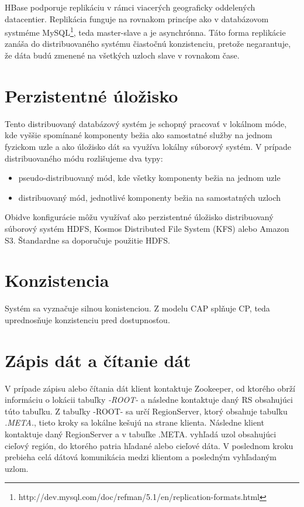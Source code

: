 \documentclass[11pt,twoside,a4paper]{book}
\begin{document}
HBase podporuje replikáciu v rámci viacerých geograficky oddelených datacentier. Replikácia funguje na rovnakom princípe ako v databázovom systméme MySQL\footnote{http://dev.mysql.com/doc/refman/5.1/en/replication-formats.html}, teda master-slave a je asynchrónna. Táto forma replikácie zanáša do distribuovaného systému čiastočnú konzistenciu, pretože negarantuje, že dáta budú zmenené na všetkých uzloch slave v rovnakom čase.




\section{Perzistentné úložisko}

Tento distribuovaný databázový systém je schopný pracovať v lokálnom móde, kde vyššie spomínané komponenty bežia ako samostatné služby na jednom fyzickom uzle a ako úložisko dát sa využíva lokálny súborový systém. V prípade distribuovaného módu rozlišujeme dva typy:
\begin{itemize}
 \item pseudo-distribuovaný mód, kde všetky komponenty bežia na jednom uzle
 \item distribuovaný mód, jednotlivé komponenty bežia na samostatných uzloch
\end{itemize}

Obidve konfigurácie môžu využívať ako perzistentné úložisko distribuovaný súborový systém HDFS, Kosmos Distributed File System (KFS) alebo Amazon S3. Štandardne sa doporučuje použitie HDFS.

\section{Konzistencia}

Systém sa vyznačuje silnou konistenciou. Z modelu CAP splňuje CP, teda uprednosňuje konzistenciu pred dostupnosťou.


\section{Zápis dát a čítanie dát}


V prípade zápisu alebo čítania dát klient kontaktuje Zookeeper, od ktorého obrží informáciu o lokácii tabuľky \emph{-ROOT-} a následne kontaktuje daný RS obsahujúci túto tabuľku. Z tabuľky -ROOT- sa určí RegionServer, ktorý obsahuje tabuľku \emph{.META.}, tieto kroky sa lokálne kešujú na strane klienta. Následne klient kontaktuje daný RegionServer a v tabuľke .META. vyhľadá uzol obsahujúci cieľový región, do ktorého patria hľadané alebo cieľové dáta. V poslednom kroku prebieha celá dátová komunikácia medzi klientom a posledným vyhľadaným uzlom.
\end{document}
